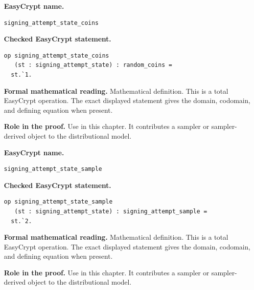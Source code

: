 \begin{formaldefinition}
\noindent\textbf{EasyCrypt name.}
\begin{lstlisting}[language=EasyCrypt,basicstyle=\ttfamily\scriptsize]
signing_attempt_state_coins
\end{lstlisting}
\noindent\textbf{Checked EasyCrypt statement.}
\begin{lstlisting}[language=EasyCrypt,basicstyle=\ttfamily\scriptsize]
op signing_attempt_state_coins
   (st : signing_attempt_state) : random_coins =
  st.`1.
\end{lstlisting}
\noindent\textbf{Formal mathematical reading.}
Mathematical definition. This is a total EasyCrypt operation.  The exact displayed statement gives the domain, codomain, and defining equation when present.

\noindent\textbf{Role in the proof.}
Use in this chapter. It contributes a sampler or sampler-derived object to the distributional model.

\end{formaldefinition}

\begin{formaldefinition}
\noindent\textbf{EasyCrypt name.}
\begin{lstlisting}[language=EasyCrypt,basicstyle=\ttfamily\scriptsize]
signing_attempt_state_sample
\end{lstlisting}
\noindent\textbf{Checked EasyCrypt statement.}
\begin{lstlisting}[language=EasyCrypt,basicstyle=\ttfamily\scriptsize]
op signing_attempt_state_sample
   (st : signing_attempt_state) : signing_attempt_sample =
  st.`2.
\end{lstlisting}
\noindent\textbf{Formal mathematical reading.}
Mathematical definition. This is a total EasyCrypt operation.  The exact displayed statement gives the domain, codomain, and defining equation when present.

\noindent\textbf{Role in the proof.}
Use in this chapter. It contributes a sampler or sampler-derived object to the distributional model.

\end{formaldefinition}

